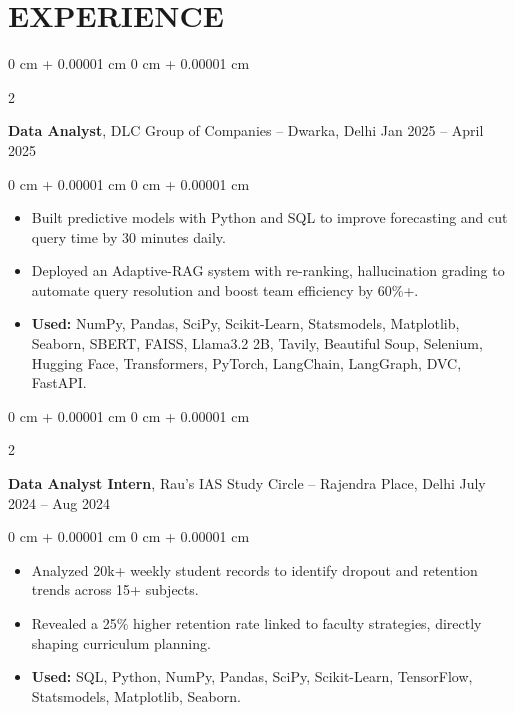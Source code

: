 \documentclass[10pt, letterpaper]{article}
\newenvironment{highlights}{
    \begin{itemize}[
        topsep=0.10 cm,
        parsep=0.10 cm,
        partopsep=0pt,
        itemsep=0pt,
        leftmargin=0 cm + 10pt
    ]
}{
    \end{itemize}
} %
\newenvironment{onecolentry}{
    \begin{adjustwidth}{
        0 cm + 0.00001 cm
    }{
        0 cm + 0.00001 cm
    }
}{
    \end{adjustwidth}
} %
\newenvironment{twocolentry}[2][]{
    \onecolentry
    \def\secondColumn{#2}
    \setcolumnwidth{\fill, 4 cm}
    \begin{paracol}{2}
}{
    \switchcolumn \raggedleft \secondColumn
    \end{paracol}
    \endonecolentry
} %
\begin{document}
    
    \section{EXPERIENCE}
        
        \begin{twocolentry}{
            Jan 2025 – April 2025
        }
            \textbf{Data Analyst}, DLC Group of Companies -- Dwarka, Delhi\end{twocolentry}

        \vspace{0.10 cm}
        \begin{onecolentry}
            \begin{highlights}
                \item Built predictive models with Python and SQL to improve forecasting and cut query time by 30 minutes daily.
                \item Deployed an Adaptive-RAG system with re-ranking, hallucination grading to automate query resolution and boost team efficiency by 60\%+.
                \item \textbf{Used:} NumPy, Pandas, SciPy, Scikit-Learn, Statsmodels, Matplotlib, Seaborn, SBERT, FAISS, Llama3.2 2B, Tavily, Beautiful Soup, Selenium, Hugging Face, Transformers, PyTorch, LangChain, LangGraph, DVC, FastAPI.
            \end{highlights}
        \end{onecolentry}

        \vspace{0.2 cm}

        \begin{twocolentry}{
            July 2024 – Aug 2024
        }
            \textbf{Data Analyst Intern}, Rau's IAS Study Circle -- Rajendra Place, Delhi\end{twocolentry}

        \vspace{0.10 cm}
        \begin{onecolentry}
            \begin{highlights}
                \item Analyzed 20k+ weekly student records to identify dropout and retention trends across 15+ subjects.
                \item Revealed a 25\% higher retention rate linked to faculty strategies, directly shaping curriculum planning.
                \item \textbf{Used:} SQL, Python, NumPy, Pandas, SciPy, Scikit-Learn, TensorFlow, Statsmodels, Matplotlib, Seaborn.
            \end{highlights}
        \end{onecolentry}
\end{document}
